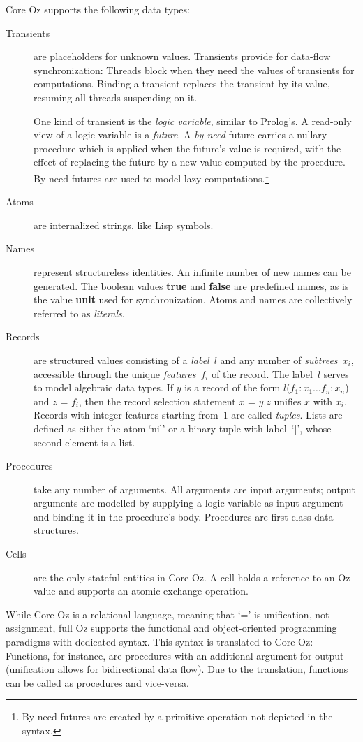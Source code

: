 \documentclass{entcs}
\newcommand{\kw}[1]{{\bfseries#1}}
\begin{document}
Core Oz supports the following data types:
\begin{description}
\item[Transients] are placeholders for unknown values.  Transients provide
  for data-flow synchronization:  Threads block when they need the values
  of transients for computations.  Binding a transient replaces the transient
  by its value, resuming all threads suspending on it.

  One kind of transient is the \emph{logic variable}, similar to Prolog's.
  A read-only view of a logic variable is a \emph{future}.  A \emph{by-need}
  future carries a nullary procedure which is applied when the future's
  value is required, with the effect of replacing the future by a new
  value computed by the procedure.  By-need futures are used to model lazy
  computations.\footnote{By-need futures are created by a primitive operation
  not depicted in the syntax.}
\item[Atoms] are internalized strings, like Lisp symbols.
\item[Names] represent structureless identities.  An infinite number of new
  names can be generated.  The boolean values \kw{true} and \kw{false} are
  predefined names, as is the value \kw{unit} used for synchronization.
  Atoms and names are collectively referred to as \emph{literals}.
\item[Records] are structured values consisting of a \emph{label}~$l$ and
  any number of \emph{subtrees}~$x_i$, accessible through the unique
  \emph{features}~$f_i$ of the record.  The label~$l$ serves to model
  algebraic data types.  If $y$ is a record of the form $l$($f_1: x_1
  \ldots f_n: x_n$) and $z$ = $f_i$, then the record selection statement
  $x$ = $y$.$z$ unifies $x$ with $x_i$.  Records with integer features
  starting from~$1$ are called \emph{tuples}.  Lists are defined as either
  the atom `nil' or a binary tuple with label~`$|$', whose second element
  is a list.
\item[Procedures] take any number of arguments.  All arguments are input
  arguments; output arguments are modelled by supplying a logic variable as
  input argument and binding it in the procedure's body.  Procedures are
  first-class data structures.
\item[Cells] are the only stateful entities in Core Oz.  A cell holds a
  reference to an Oz value and supports an atomic exchange operation.
\end{description}

\noindent While Core Oz is a relational language, meaning that `='
is unification, not assignment, full Oz supports the functional and
object-oriented programming paradigms with dedicated syntax.  This syntax
is translated to Core Oz:  Functions, for instance, are procedures with an
additional argument for output (unification allows for bidirectional data
flow).  Due to the translation, functions can be called as procedures and
vice-versa.
\end{document}
